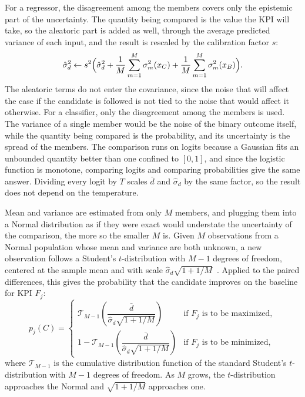 For a regressor, the disagreement among the members covers only the
epistemic part of the uncertainty. The quantity being compared is the value
the KPI will take, so the aleatoric part is added as well, through the
average predicted variance of each input, and the result is rescaled by the
calibration factor $s$:
\begin{equation}
  \hat{\sigma}_d^{2} \leftarrow s^{2} \Bigl( \hat{\sigma}_d^{2} +
  \frac{1}{M} \sum_{m=1}^{M} \sigma_m^{2}(x_C) +
  \frac{1}{M} \sum_{m=1}^{M} \sigma_m^{2}(x_B) \Bigr).
  \label{eq:met:on:regvar}
\end{equation}
The aleatoric terms do not enter the covariance, since the noise that will
affect the case if the candidate is followed is not tied to the noise that
would affect it otherwise. For a classifier, only the disagreement among the
members is used. The variance of a single member would be the noise of the
binary outcome itself, while the quantity being compared is the probability,
and its uncertainty is the spread of the members. The comparison runs on
logits because a Gaussian fits an unbounded quantity better than one
confined to $[0, 1]$, and since the logistic function is monotone, comparing
logits and comparing probabilities give the same answer. Dividing every
logit by $T$ scales $\bar{d}$ and $\hat{\sigma}_d$ by the same factor, so the
result does not depend on the temperature.

Mean and variance are estimated from only $M$ members, and plugging them
into a Normal distribution as if they were exact would understate the
uncertainty of the comparison, the more so the smaller $M$ is. Given $M$
observations from a Normal population whose mean and variance are both
unknown, a new observation follows a Student's $t$-distribution with $M-1$
degrees of freedom, centered at the sample mean and with scale
$\hat{\sigma}_d \sqrt{1 + 1/M}$~\cite{gelman2013}. Applied to the paired
differences, this gives the probability that the candidate improves on the
baseline for KPI $F_j$:
\begin{equation}
  p_j(C) =
  \begin{cases}
    \mathcal{T}_{M-1}\!\left( \dfrac{\bar{d}}{\hat{\sigma}_d \sqrt{1 + 1/M}}
    \right) & \text{if } F_j \text{ is to be maximized},\\[3ex]
    1 - \mathcal{T}_{M-1}\!\left( \dfrac{\bar{d}}{\hat{\sigma}_d \sqrt{1 + 1/M}}
    \right) & \text{if } F_j \text{ is to be minimized},
  \end{cases}
  \label{eq:met:on:prob}
\end{equation}
where $\mathcal{T}_{M-1}$ is the cumulative distribution function of the standard
Student's $t$-distribution with $M-1$ degrees of freedom. As $M$ grows, the
$t$-distribution approaches the Normal and $\sqrt{1 + 1/M}$ approaches one.

